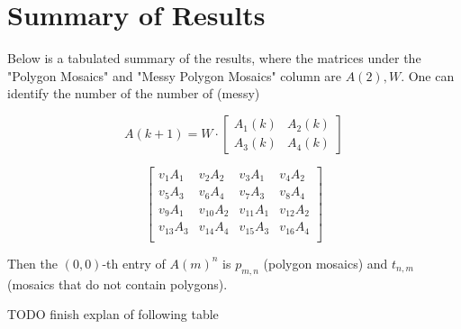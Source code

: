 \documentclass[12pt]{article}
\theoremstyle{plain}
\theoremstyle{definition}
\theoremstyle{remark}
\theoremstyle{definition}
\begin{document}
\section{Summary of Results}
\label{section: summary of results}

Below is a tabulated summary of the results, where the matrices under the "Polygon Mosaics" and "Messy Polygon Mosaics" column are $A(2), W$. One can identify the number of  the number of (messy)

$$A(k+1) = W \cdot \begin{bmatrix}
    A_1(k) & A_2(k) \\
    A_3(k) & A_4(k)
    \end{bmatrix}$$

$$\begin{bmatrix}
    v_{1}A_1 & v_{2}A_2 & v_{3}A_1 & v_{4}A_2 \\
    v_{5}A_3 & v_{6}A_4 & v_{7}A_3 & v_{8}A_4 \\
    v_{9}A_1 & v_{10}A_2 & v_{11}A_1 & v_{12}A_2 \\
    v_{13}A_3 & v_{14}A_4 & v_{15}A_3 & v_{16}A_4 \\
\end{bmatrix}$$

Then the $(0,0)$-th entry of $A(m)^n$ is $p_{m,n}$ (polygon mosaics) and $t_{n,m}$ (mosaics that do not contain polygons).

TODO finish explan of following table
\end{document}
